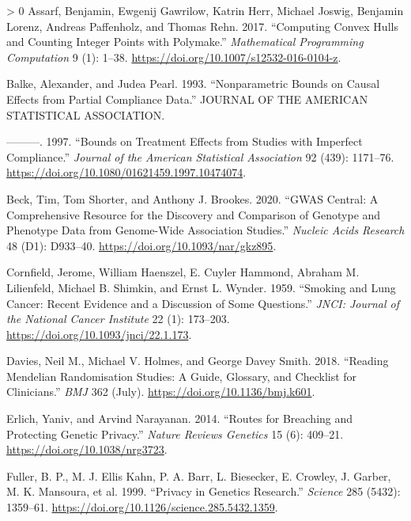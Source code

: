 \documentclass[
]{article}
\theoremstyle{plain}
\newlength{\cslhangindent}
\newenvironment{CSLReferences}[3] %
 {%
  \setlength{\parindent}{0pt}
  \ifodd #1 \everypar{\setlength{\hangindent}{\cslhangindent}}\ignorespaces\fi
  \ifnum #2 > 0
  \setlength{\parskip}{#2\baselineskip}
  \fi
 }%
 {}
\begin{document}
\hypertarget{refs}{}
\begin{CSLReferences}{1}{0}
\leavevmode\hypertarget{ref-assarf_computing_2017}{}%
Assarf, Benjamin, Ewgenij Gawrilow, Katrin Herr, Michael Joswig, Benjamin Lorenz, Andreas Paffenholz, and Thomas Rehn. 2017. {``Computing Convex Hulls and Counting Integer Points with Polymake.''} \emph{Mathematical Programming Computation} 9 (1): 1--38. \url{https://doi.org/10.1007/s12532-016-0104-z}.

\leavevmode\hypertarget{ref-balke_nonparametric_1993}{}%
Balke, Alexander, and Judea Pearl. 1993. {``Nonparametric {Bounds} on {Causal Effects} from {Partial Compliance Data}.''} {JOURNAL OF THE AMERICAN STATISTICAL ASSOCIATION}.

\leavevmode\hypertarget{ref-balke_bounds_1997}{}%
---------. 1997. {``Bounds on {Treatment Effects} from {Studies} with {Imperfect Compliance}.''} \emph{Journal of the American Statistical Association} 92 (439): 1171--76. \url{https://doi.org/10.1080/01621459.1997.10474074}.

\leavevmode\hypertarget{ref-beck_gwas_2020}{}%
Beck, Tim, Tom Shorter, and Anthony J. Brookes. 2020. {``{GWAS Central}: A Comprehensive Resource for the Discovery and Comparison of Genotype and Phenotype Data from Genome-Wide Association Studies.''} \emph{Nucleic Acids Research} 48 (D1): D933--40. \url{https://doi.org/10.1093/nar/gkz895}.

\leavevmode\hypertarget{ref-cornfield_smoking_1959}{}%
Cornfield, Jerome, William Haenszel, E. Cuyler Hammond, Abraham M. Lilienfeld, Michael B. Shimkin, and Ernst L. Wynder. 1959. {``Smoking and {Lung Cancer}: {Recent Evidence} and a {Discussion} of {Some Questions}.''} \emph{JNCI: Journal of the National Cancer Institute} 22 (1): 173--203. \url{https://doi.org/10.1093/jnci/22.1.173}.

\leavevmode\hypertarget{ref-davies_reading_2018}{}%
Davies, Neil M., Michael V. Holmes, and George Davey Smith. 2018. {``Reading {Mendelian} Randomisation Studies: A Guide, Glossary, and Checklist for Clinicians.''} \emph{BMJ} 362 (July). \url{https://doi.org/10.1136/bmj.k601}.

\leavevmode\hypertarget{ref-erlich_routes_2014}{}%
Erlich, Yaniv, and Arvind Narayanan. 2014. {``Routes for Breaching and Protecting Genetic Privacy.''} \emph{Nature Reviews Genetics} 15 (6): 409--21. \url{https://doi.org/10.1038/nrg3723}.

\leavevmode\hypertarget{ref-fuller_privacy_1999}{}%
Fuller, B. P., M. J. Ellis Kahn, P. A. Barr, L. Biesecker, E. Crowley, J. Garber, M. K. Mansoura, et al. 1999. {``Privacy in {Genetics Research}.''} \emph{Science} 285 (5432): 1359--61. \url{https://doi.org/10.1126/science.285.5432.1359}.


\end{CSLReferences}
\end{document}
